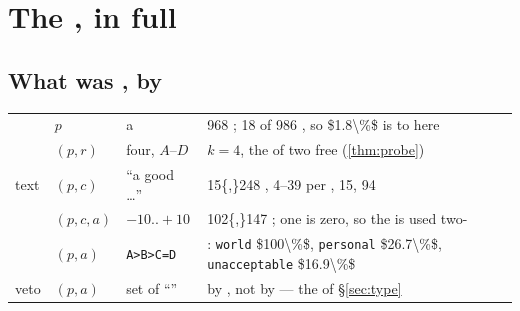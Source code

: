 \section{The , in full}
\label{sec:coval}

\subsection{What was ,  by }

\begin{table}[H]\centering\footnotesize
\begin{tabularx}{\textwidth}{P{2.4cm}P{2.0cm}P{3.4cm}Y}
\toprule
{} &  &  &  \\
\midrule
{} & $p$ & a  & \num{968} ; \num{18} of \num{986} 
  , so \num{$1.8\%$} is  to   here\\
 & $(p,r)$ &  four,  $A$--$D$ &  $k=4$,  the
  of two free  (\cref{thm:probe})\\
 text & $(p,c)$ & ``a good  \dots'' & \num{15{,}248}
, \num{4}--\num{39} per ,  \num{15},   \num{94}
\\
 & $(p,c,a)$ & $-10..{+}10$ & \num{102{,}147} ;  \num{one} is
zero, so the  is used  two-\\
 & $(p,a)$ & \texttt{A>B>C=D} &  : \texttt{world}
\num{$100\%$}, \texttt{personal} \num{$26.7\%$}, \texttt{unacceptable}
\num{$16.9\%$}\\
veto & $(p,a)$ & set of ``'' &  by \emph{}, not by
 --- the   of §\ref{sec:type}\\

\end{tabularx}
\end{table}
